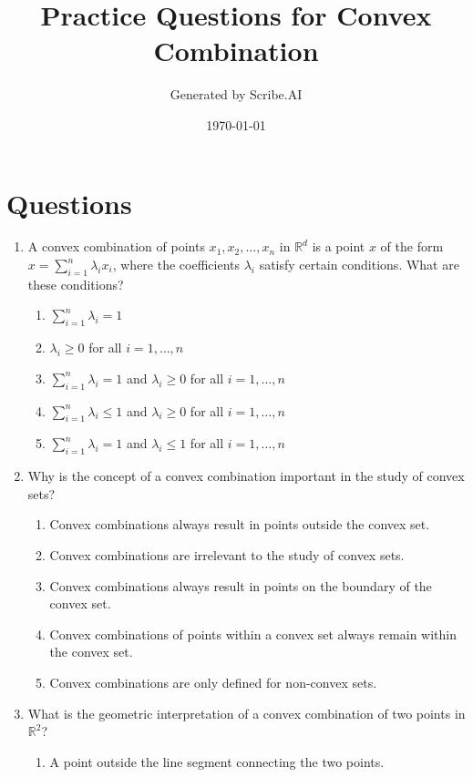 \documentclass{article}%
\title{Practice Questions for Convex Combination}%
\author{Generated by Scribe.AI}%
\date{\today}%
\begin{document}
%
\normalsize%
\maketitle%
\section{Questions}%
\label{sec:Questions}%
\begin{enumerate}%
\item A convex combination of points $x_1, x_2, \dots, x_n$ in $\mathbb{R}^d$ is a point $x$ of the form $x = \sum_{i=1}^n \lambda_i x_i$, where the coefficients $\lambda_i$ satisfy certain conditions. What are these conditions?%
\begin{enumerate}%
\item $\sum_{i=1}^n \lambda_i = 1$%
\item $\lambda_i \ge 0$ for all $i = 1, \dots, n$%
\item $\sum_{i=1}^n \lambda_i = 1$ and $\lambda_i \ge 0$ for all $i = 1, \dots, n$%
\item $\sum_{i=1}^n \lambda_i \le 1$ and $\lambda_i \ge 0$ for all $i = 1, \dots, n$%
\item $\sum_{i=1}^n \lambda_i = 1$ and $\lambda_i \le 1$ for all $i = 1, \dots, n$%
\end{enumerate}%
\vspace{1em}%
\item Why is the concept of a convex combination important in the study of convex sets?%
\begin{enumerate}%
\item Convex combinations always result in points outside the convex set.%
\item Convex combinations are irrelevant to the study of convex sets.%
\item Convex combinations always result in points on the boundary of the convex set.%
\item Convex combinations of points within a convex set always remain within the convex set.%
\item Convex combinations are only defined for non-convex sets.%
\end{enumerate}%
\vspace{1em}%
\item What is the geometric interpretation of a convex combination of two points in $\mathbb{R}^2$?%
\begin{enumerate}%
\item A point outside the line segment connecting the two points.%

\end{enumerate}
\end{enumerate}
\end{document}
